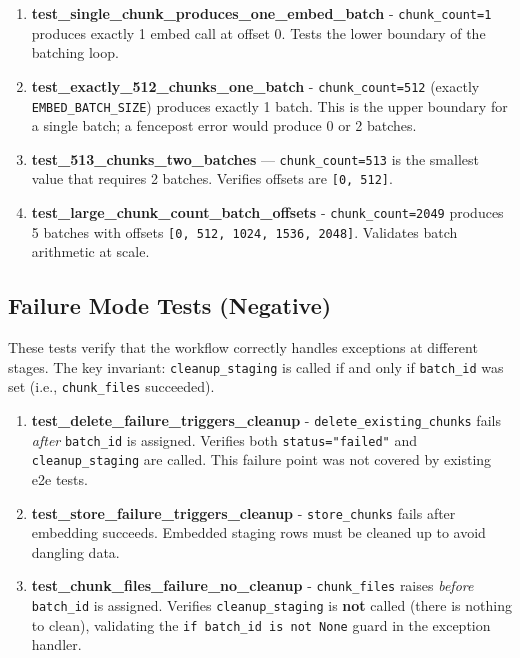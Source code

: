 \documentclass[a4paper,12pt]{article}
\begin{document}
\begin{enumerate}
  \item \textbf{test\_single\_chunk\_produces\_one\_embed\_batch} -
    \texttt{chunk\_count=1} produces exactly 1 embed call at offset 0.
    Tests the lower boundary of the batching loop.

  \item \textbf{test\_exactly\_512\_chunks\_one\_batch} -
    \texttt{chunk\_count=512} (exactly \texttt{EMBED\_BATCH\_SIZE}) produces exactly 1 batch.
    This is the upper boundary for a single batch; a fencepost error would produce 0 or 2 batches.

  \item \textbf{test\_513\_chunks\_two\_batches} ---
    \texttt{chunk\_count=513} is the smallest value that requires 2 batches.
    Verifies offsets are \texttt{[0, 512]}.

  \item \textbf{test\_large\_chunk\_count\_batch\_offsets} -
    \texttt{chunk\_count=2049} produces 5 batches with offsets
    \texttt{[0, 512, 1024, 1536, 2048]}.
    Validates batch arithmetic at scale.
\end{enumerate}

\subsection{Failure Mode Tests (Negative)}

These tests verify that the workflow correctly handles exceptions at different stages.
The key invariant: \texttt{cleanup\_staging} is called if and only if \texttt{batch\_id}
was set (i.e., \texttt{chunk\_files} succeeded).

\begin{enumerate}[resume]
  \item \textbf{test\_delete\_failure\_triggers\_cleanup} -
    \texttt{delete\_existing\_chunks} fails \emph{after} \texttt{batch\_id} is assigned.
    Verifies both \texttt{status="failed"} and \texttt{cleanup\_staging} are called.
    This failure point was not covered by existing e2e tests.

  \item \textbf{test\_store\_failure\_triggers\_cleanup} -
    \texttt{store\_chunks} fails after embedding succeeds.
    Embedded staging rows must be cleaned up to avoid dangling data.

  \item \textbf{test\_chunk\_files\_failure\_no\_cleanup} -
    \texttt{chunk\_files} raises \emph{before} \texttt{batch\_id} is assigned.
    Verifies \texttt{cleanup\_staging} is \textbf{not} called (there is nothing to clean),
    validating the \texttt{if batch\_id is not None} guard in the exception handler.
\end{enumerate}
\end{document}
